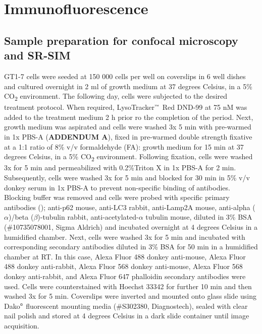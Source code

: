 \section{Immunofluorescence}
\subsection{Sample preparation for confocal microscopy and SR-SIM}
GT1-7 cells were seeded at 150 000 cells per well on coverslips in 6 well dishes and cultured overnight in 2 ml of growth medium at 37 degrees Celsius, in a 5\% CO\textsubscript{2} environment. The following day, cells were subjected to the desired treatment protocol. When required, LysoTracker${\textsuperscript{\tiny{\texttrademark}}}$ Red DND-99 at 75 nM was added to the treatment medium 2 h prior ro the completion of the period. Next, growth medium was aspirated and cells were washed 3x 5 min with pre-warmed in 1x PBS-A (\textbf{ADDENDUM A}), fixed in pre-warmed double strength fixative at a 1:1 ratio of 8\% v/v formaldehyde (FA): growth medium for 15 min at 37 degrees Celsius, in a 5\% CO\textsubscript{2} environment. Following fixation, cells were washed 3x for 5 min and permeabilized with 0.2\%Triton X in 1x PBS-A for 2 min. Subsequently, cells were washed 3x for 5 min and blocked for 30 min in 5\% v/v donkey serum in 1x PBS-A to prevent non-specific binding of antibodies. Blocking buffer was removed and cells were probed with specific primary antibodies (); anti-p62 mouse, anti-LC3 rabbit, anti-Lamp2A mouse, anti-alpha ($\alpha$)/beta ($\beta$)-tubulin rabbit, anti-acetylated-$\alpha$ tubulin mouse, diluted in 3\% BSA (\#10735078001, Sigma Aldrich) and incubated overnight at 4 degrees Celsius in a humidified chamber. Next, cells were washed 3x for 5 min and incubated with corresponding secondary antibodies diluted in 3\% BSA for 50 min in a humidified chamber at RT. In this case, Alexa Fluor 488 donkey anti-mouse, Alexa Fluor 488 donkey anti-rabbit, Alexa Fluor 568 donkey anti-mouse, Alexa Fluor 568 donkey anti-rabbit, and Alexa Fluor 647 phalloidin secondary antibodies were used. Cells were counterstained with Hoechst 33342 for further 10 min and then washed 3x for 5 min. Coverslips were inverted and mounted onto glass slide using Dako${\textsuperscript{\tiny{\textregistered}}}$ fluorescent mounting media (\#S302380, Diagnostech), sealed with clear nail polish and stored at 4 degrees Celsius in a dark slide container until image acquisition.

